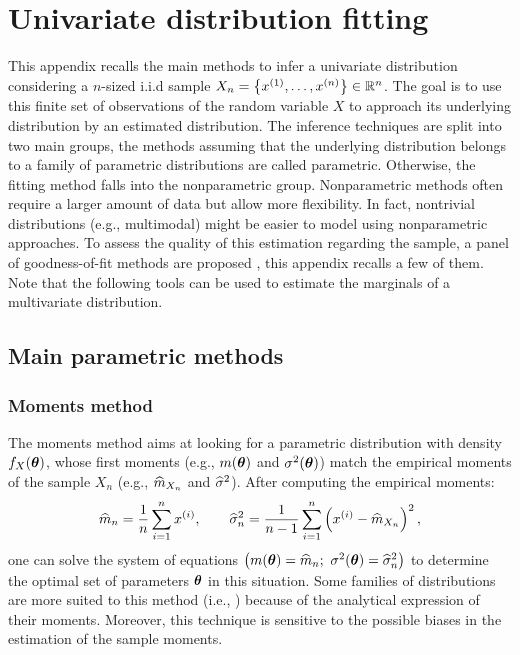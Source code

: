\cleardoublepage
\chapter{Univariate distribution fitting}
\label{apx:A}

This appendix recalls the main methods to infer a univariate distribution considering a $n$-sized i.i.d sample $X_n = \left\{x^{(1)}, \dots, x^{(n)}\right\} \in \mathbb{R}^{n}$. 
The goal is to use this finite set of observations of the random variable $X$ to approach its underlying distribution by an estimated distribution.
The inference techniques are split into two main groups, the methods assuming that the underlying distribution belongs to a family of parametric distributions are called parametric. 
Otherwise, the fitting method falls into the nonparametric group. 
Nonparametric methods often require a larger amount of data but allow more flexibility. 
In fact, nontrivial distributions (e.g., multimodal) might be easier to model using nonparametric approaches.
To assess the quality of this estimation regarding the sample, a panel of goodness-of-fit methods are proposed , this appendix recalls a few of them. 
Note that the following tools can be used to estimate the marginals of a multivariate distribution.

\section{Main parametric methods}

\subsection*{Moments method}
The moments method aims at looking for a parametric distribution with density $f_X({\boldsymbol{\theta}})$, whose first moments (e.g., $m({\boldsymbol{\theta}})$ and $\sigma^2({\boldsymbol{\theta}})$) match 
the empirical moments of the sample $X_n$ (e.g., $\widehat{m}_{X_n}$ and $\widehat{\sigma}^2$). After computing the empirical moments: 
\begin{equation}
    \widehat{m}_{n} = \frac1n \sum_{i=1}^{n} x^{(i)}, \qquad \widehat{\sigma}^2_n = \frac{1}{n-1} \sum_{i=1}^{n} \left(x^{(i)} - \widehat{m}_{X_n}\right)^2,
\end{equation} 
one can solve the system of equations $\left(m(\btheta) = \what{m}_{n}; \ \sigma^2(\btheta) = \what{\sigma}_n^2\right)$ to determine the optimal set of parameters ${\boldsymbol{\theta}}$ in this situation. 
Some families of distributions are more suited to this method (i.e., ) because of the analytical expression of their moments. 
Moreover, this technique is sensitive to the possible biases in the estimation of the sample moments.

